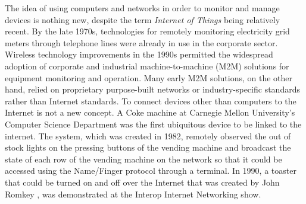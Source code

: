 \documentclass[conference]{IEEEtran}
\begin{document}
The idea of using computers and networks in order to monitor and manage devices
is nothing new, despite the term \textit{Internet of Things} being relatively
recent. By the late 1970s, technologies for remotely monitoring electricity
grid meters through telephone lines were already in use in the corporate
sector. Wireless technology improvements in the 1990s permitted the widespread
adoption of corporate and industrial machine-to-machine (M2M) solutions for
equipment monitoring and operation. Many early M2M solutions, on the other
hand, relied on proprietary purpose-built networks or industry-specific
standards rather than Internet standards. To connect devices other than
computers to the Internet is not a new concept. A Coke machine at Carnegie
Mellon University's Computer Science Department \cite{EverhartInteresting}
was the first ubiquitous device to be linked to the internet. The system,
which was created in 1982, remotely observed the out of stock lights on the
pressing buttons of the vending machine and broadcast the state of each row
of the vending machine on the network so that it could be accessed using
the Name/Finger protocol through a terminal. In 1990, a toaster that could
be turned on and off over the Internet that was created by John Romkey \cite{RomkeyToast},
was demonstrated at the Interop Internet Networking show.

\end{document}
